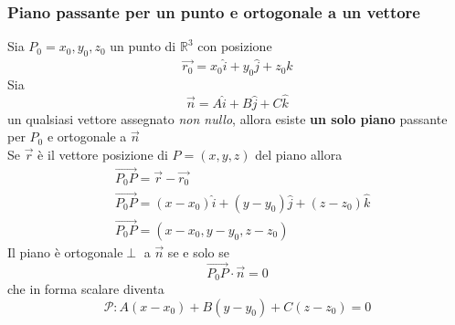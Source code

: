 \documentclass[twoside]{article}
\begin{document}
\subsubsection{Piano passante per un punto e ortogonale a un vettore}
Sia \(P_0= x_0, y_0,z_0\) un punto di \(\mathbb{R}^3\) con posizione
\begin{equation*}
  \vec{r_0}= x_0 \hat{i} + y_0 \hat{j} + z_0 \hat{k}
\end{equation*}
Sia \[\vec{n}= A \hat{i} + B \hat{j} + C \hat{k}\] un qualsiasi vettore assegnato \textit{non nullo}, allora esiste \textbf{un solo piano} passante per \(P_0\) e ortogonale a \(\vec{n}\)\\
Se \(\vec{r}\) è il vettore posizione di \(P= (x, y,z)\) del piano allora
\begin{eqnarray*}
  &\vec{P_0 P} = \vec{r} - \vec{r_0}\\
  &\vec{P_0 P} = (x - x_0) \hat{i} + (y - y_0) \hat{j} + (z - z_0) \hat{k}\\
  &\vec{P_0 P} = (x - x_0, y - y_0, z - z_0)
\end{eqnarray*}
Il piano è ortogonale\(\perp\) a \(\vec{n}\) se e solo se
\begin{equation}
  \boxed{\vec{P_0 P} \cdot \vec{n} = 0}
\end{equation}
che in forma scalare diventa
\begin{equation}
  \boxed{ \mathcal{P} : A(x - x_0) + B(y - y_0) + C(z - z_0) = 0}
\end{equation}
\end{document}
